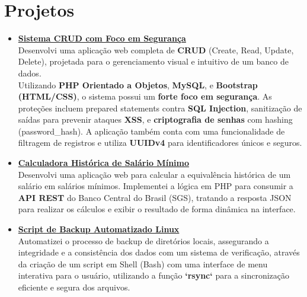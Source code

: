 \documentclass[a4paper,12pt]{article}
\begin{document}
\section*{Projetos}
\begin{itemize}[noitemsep, nolistsep, leftmargin=*, itemsep=8pt]
    \item 
        \href{https://github.com/nicolas-mendes/CRUD_PHP}{\textbf{Sistema CRUD com Foco em Segurança}} \\ 
Desenvolvi uma aplicação web completa de \textbf{CRUD} (Create, Read, Update, Delete), projetada para o gerenciamento visual e intuitivo de um banco de dados. \\
Utilizando \textbf{PHP Orientado a Objetos}, \textbf{MySQL}, e \textbf{Bootstrap (HTML/CSS)}, o sistema possui um \textbf{forte foco em segurança}. As proteções incluem prepared statements contra \textbf{SQL Injection}, sanitização de saídas para prevenir ataques \textbf{XSS}, e \textbf{criptografia de senhas} com hashing (password\_hash). A aplicação também conta com uma funcionalidade de filtragem de registros e utiliza \textbf{UUIDv4}  para identificadores únicos e seguros.

    \item 
        \href{https://github.com/nicolas-mendes/consulta-historica-salario-minimo}{\textbf{Calculadora Histórica de Salário Mínimo}} \\
        Desenvolvi uma aplicação web para calcular a equivalência histórica de um salário em salários mínimos. Implementei a lógica em PHP para consumir a \textbf{API REST} do Banco Central do Brasil (SGS), tratando a resposta JSON para realizar os cálculos e exibir o resultado de forma dinâmica na interface.

    \item 
        \href{https://github.com/nicolas-mendes/script-backup-linux}{\textbf{Script de Backup Automatizado Linux}} \\
        Automatizei o processo de backup de diretórios locais, assegurando a integridade e a consistência dos dados com um sistema de verificação, através da criação de um script em Shell (Bash) com uma interface de menu interativa para o usuário, utilizando a função \textbf{`rsync`} para a sincronização eficiente e segura dos arquivos.
        
\end{itemize}

\end{document}
